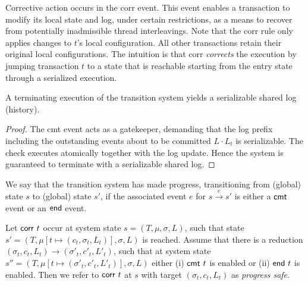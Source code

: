 Corrective action occurs in the {\sf corr} event. This event enables a
transaction to modify its local state and log, under certain
restrictions, as a means to recover from potentially inadmissible
thread interleavings.  Note that the {\sf corr} rule only applies
changes to $t$'s local configuration. All other transactions retain their original local
configurations. The intuition is that {\sf corr} \emph{corrects} the
execution by jumping transaction $t$ to a state that is reachable
starting from the entry state through a serialized execution.



\begin{theorem}[Soundness] A terminating execution of the transition system yields a serializable shared log (history).
\begin{proof}
	The {\sf cmt} event acts as a gatekeeper, demanding that the log prefix including the outstanding events about to be committed $L\cdot L_t$ is serializable. The check executes atomically together with the log update. Hence the system is guaranteed to terminate with a serializable shared log.	
\end{proof}
\end{theorem}

\begin{definition}[Progress]
	We say that the transition system has made progress, transitioning from (global) state $s$ to (global) state $s'$, if the associated event $e$ for
	$s \stackrel{e}{\longrightarrow} s'$ is either a ${\sf cmt}$ event or an ${\sf end}$ event.
\end{definition}

\begin{definition}
	Let ${\sf corr}\ t$ occur at system state $s=(T,\mu,\sigma,L)$, such that state $s'=(T,\mu[t \mapsto (c_t,\sigma_t,L_t)],\sigma,L)$ is reached. Assume that there is a reduction
	$(\sigma_t,c_t,L_t) {\longrightarrow} (\sigma'_t,c'_t,L'_t)$, such that 
	at system state $s''=(T,\mu[t \mapsto (\sigma'_t,c'_t,L'_t)],\sigma,L)$ either (i)  ${\sf cmt}\ t$ is enabled or (ii) ${\sf end}\ t$ is enabled. Then we refer to ${\sf corr}\ t$ at $s$ with target $(\sigma_t,c_t,L_t)$ as \emph{progress safe}.
\end{definition}

